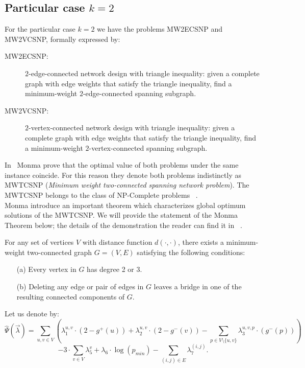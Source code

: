 \subsection{Particular case $k=2$}
For the particular case $k=2$ we have the problems MW2ECSNP and
MW2VCSNP, formally expressed by:
\begin{description}
    \item[MW2ECSNP:] $2$-edge-connected network design with triangle inequality: given a
complete graph with edge weights that satisfy the triangle
inequality, find a minimum-weight $2$-edge-connected spanning
subgraph.
    \item[MW2VCSNP:] $2$-vertex-connected network design with triangle inequality: given a
complete graph with edge weights that satisfy the triangle
inequality, find a minimum-weight $2$-vertex-connected spanning
subgraph.
\end{description}

In~\cite{117} Monma prove that the
optimal value of both problems under the same instance coincide.
For this reason they denote both problems indistinctly as MWTCSNP
(\textit{Minimum weight two-connected spanning network problem}).
The MWTCSNP belongs to the class of NP-Complete problems
~\cite{117}.\\

Monma introduce an important theorem which characterizes
global optimum solutions of the MWTCSNP. We will provide the
statement of the Monma Theorem below; the details of the
demonstration the reader can find it in ~\cite{117}.\\

\begin{theorem}[~\cite{117}] %
For any set of vertices $V$ with distance function
$d(\cdot,\cdot)$, there exists a minimum-weight two-connected
graph $G=(V,E)$ satisfying the following conditions:
\begin{enumerate}
    \item[(a)] Every vertex in $G$ has degree 2 or 3.
    \item[(b)] Deleting any edge or pair of edges in $G$ leaves a
    bridge in one of the resulting connected components of $G$.
\end{enumerate}
\end{theorem}


\noindent Let us denote by:\\

\[\hat{\Psi}(\vec{\lambda})=\sum_{u,v\in V} \left(\lambda^{u,v}_{1}\cdot (2-g^{+}(u))+\lambda^{u,v}_{2}\cdot (2-g^{-}(v))-\sum_{p\in V\setminus \{u,v\}} \lambda^{u,v,p}_{3}\cdot (g^{-}(p))\right) \]
\[-3\cdot \sum_{v\in V} \lambda^{v}_{5}+\lambda_{6}\cdot \log(p_{min})- \sum_{(i,j)\in E} \lambda^{(i,j)}_{7}. \]


